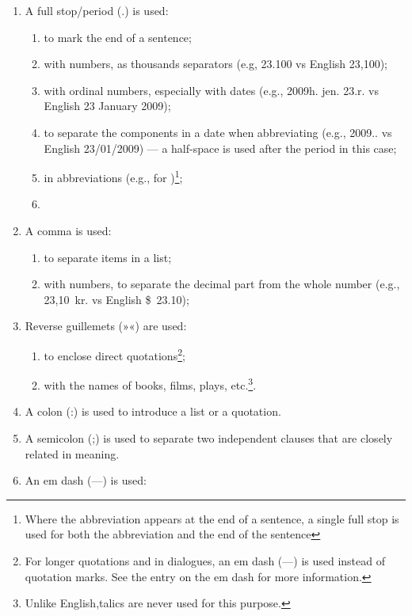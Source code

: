 \begin{enumerate}
	\item A full stop/period (.) is used:
		\begin{enumerate}
			\item to mark the end of a sentence;
			\item with numbers, as thousands separators (e.g, 23.100 vs English 23,100);
			\item with ordinal numbers, especially with dates (e.g., 2009\thinspace{}h. jen. 23.\thinspace{}r. vs English 23 January 2009);
			\item to separate the components in a date when abbreviating (e.g., 2009.. vs English 23/01/2009) — a half-space is used after the period in this case;
			\item in abbreviations (e.g.,  for )\footnote{Where the abbreviation appears at the end of a sentence, a single full stop is used for both the abbreviation and the end of the sentence};
			\item 
		\end{enumerate}
	\item A comma is used:
		\begin{enumerate}
			\item to separate items in a list;
			\item with numbers, to separate the decimal part from the whole number (e.g., 23,10~kr. vs English \$~23.10);
		\end{enumerate}
	\item Reverse guillemets (»«) are used:
		\begin{enumerate}
			\item to enclose direct quotations\footnote{For longer quotations and in dialogues, an em dash (—) is used instead of quotation marks. See the entry on the em dash for more information.};
			\item with the names of books, films, plays, etc.\footnote{Unlike English,talics are never used for this purpose.}.
		\end{enumerate}
	\item A colon (:) is used to introduce a list or a quotation.
	\item A semicolon (;) is used to separate two independent clauses that are closely related in meaning.
	\item An em dash (—) is used:
		\begin{enumerate}

\end{enumerate}
\end{enumerate}
